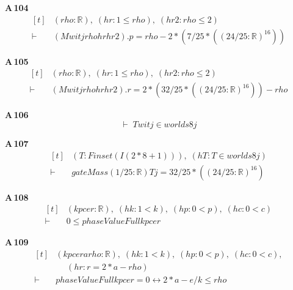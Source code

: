 \noindent\textbf{A\,104}\quad{}
{\footnotesize\[ \begin{aligned}[t]
&(\mathit{rho} : \mathbb{R} ),\; (\mathit{hr} : 1 \leq \mathit{rho}),\; (\mathit{hr2} : \mathit{rho} \leq 2)\\
\vdash\;&(\mathit{Mwit} \mathit{j} \mathit{rho} \mathit{hr} \mathit{hr2}).\mathit{p} = \mathit{rho}-2*(7/25*((24/25:\mathbb{R} )^{16}))
\end{aligned} \]}

\noindent\textbf{A\,105}\quad{}
{\footnotesize\[ \begin{aligned}[t]
&(\mathit{rho} : \mathbb{R} ),\; (\mathit{hr} : 1 \leq \mathit{rho}),\; (\mathit{hr2} : \mathit{rho} \leq 2)\\
\vdash\;&(\mathit{Mwit} \mathit{j} \mathit{rho} \mathit{hr} \mathit{hr2}).\mathit{r} = 2*(32/25*((24/25:\mathbb{R} )^{16}))-\mathit{rho}
\end{aligned} \]}

\noindent\textbf{A\,106}\quad{}
{\footnotesize\[ \vdash\; \mathit{Twit} \mathit{j} \in \mathit{worlds} 8 \mathit{j} \]}

\noindent\textbf{A\,107}\quad{}
{\footnotesize\[ \begin{aligned}[t]
&(\mathit{T} : \mathit{Finset} (\mathit{I} (2*8+1))),\; (\mathit{hT} : \mathit{T} \in \mathit{worlds} 8 \mathit{j})\\
\vdash\;&\mathit{gateMass} (1/25 : \mathbb{R} ) \mathit{T} \mathit{j} = 32/25*((24/25:\mathbb{R} )^{16})
\end{aligned} \]}

\noindent\textbf{A\,108}\quad{}
{\footnotesize\[ \begin{aligned}[t]
&(\mathit{k} \mathit{p} \mathit{c} \mathit{e} \mathit{r} : \mathbb{R} ),\; (\mathit{hk} : 1 < \mathit{k}),\; (\mathit{hp} : 0 < \mathit{p}),\; (\mathit{hc} : 0 < \mathit{c})\\
\vdash\;&0 \leq \mathit{phaseValueFull} \mathit{k} \mathit{p} \mathit{c} \mathit{e} \mathit{r}
\end{aligned} \]}

\noindent\textbf{A\,109}\quad{}
{\footnotesize\[ \begin{aligned}[t]
&(\mathit{k} \mathit{p} \mathit{c} \mathit{e} \mathit{r} \mathit{a} \mathit{rho} : \mathbb{R} ),\; (\mathit{hk} : 1 < \mathit{k}),\; (\mathit{hp} : 0 < \mathit{p}),\; (\mathit{hc} : 0 < \mathit{c}),\\
&\quad \; (\mathit{hr} : \mathit{r} = 2*\mathit{a}-\mathit{rho})\\
\vdash\;&\mathit{phaseValueFull} \mathit{k} \mathit{p} \mathit{c} \mathit{e} \mathit{r} = 0 \leftrightarrow 2*\mathit{a}-\mathit{e}/\mathit{k} \leq \mathit{rho}
\end{aligned} \]}

